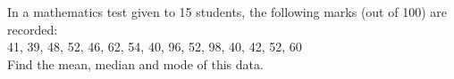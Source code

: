 In a mathematics test given to 15 students, the
following marks (out of 100) are recorded:\\
41, 39, 48, 52, 46, 62, 54, 40, 96, 52, 98, 40,
42, 52, 60\\
Find the mean, median and mode of this data.
